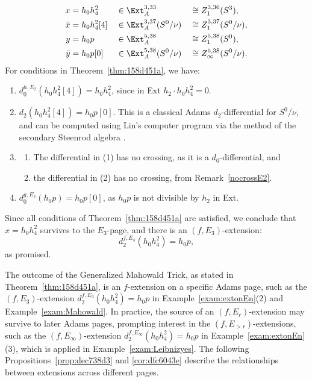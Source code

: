 \documentclass{amsart}
\numberwithin{equation}{section}
\begin{document}
\begin{example}
\begin{align*}
x & =h_0h_4^2 && \in \Ext_A^{3,33} && \cong Z_1^{3,36}(S^3),\\
\bar{x} & =h_0h_4^2[4] && \in \Ext_A^{3,37}(S^0/\nu) && \cong Z_1^{3,37}(S^0/\nu), \\
y & =h_0p && \in \Ext_A^{5,38} && \cong Z_1^{5,38}(S^0),\\
        \bar{y} & =h_0p[0] && \in \Ext_A^{5,38}(S^0/\nu) && \cong Z_\infty^{5,38}(S^0/\nu). 
  \end{align*}      
For conditions in Theorem~\ref{thm:158d451a}, we have:
\begin{enumerate}
      \item $d_0^{h, E_2}(h_0h_4^2[4]) = h_0h_4^2$, since in Ext $h_2 \cdot h_0h_4^2 = 0$.
      \item $d_2(h_0h_4^2[4]) = h_0p[0]$. This is a classical Adams $d_2$-differential for $S^0/\nu$, and can be computed using Lin's computer program via the method of the secondary Steenrod algebra \cite{BJ, Nassau, Chua}.
      \item 
      \begin{enumerate}
          \item The differential in (1) has no crossing, as it is a $d_0$-differential, and
          \item the differential in (2) has no crossing, from Remark~\ref{nocrossE2}. 
      \end{enumerate}
      \item 
      $d_0^{g, E_2} (h_0p) = h_0p[0]$, as $h_0p$ is not divisible by $h_2$ in Ext.
      \end{enumerate}
    Since all conditions of  Theorem~\ref{thm:158d451a} are  satisfied, we conclude that $x=h_0h_4^2$ survives to the $E_3$-page, and there is an $(f, E_3)$-extension:
        $$d_2^{f, E_3} (h_0h_4^2) = h_0 p,$$
        as promised.
        
\end{example}

The outcome of the Generalized Mahowald Trick, as stated in Theorem~\ref{thm:158d451a}, is an $f$-extension on a specific Adams page, such as the $(f, E_3)$-extension $d_2^{f, E_3} (h_0h_4^2) = h_0 p$ in Example~\ref{exam:extonEn}(2) and Example~\ref{exam:Mahowald}. In practice, the source of an $(f, E_r)$-extension may survive to later Adams pages, prompting interest in the $(f, E_{>r})$-extensions, such as the $(f, E_\infty)$-extension $d_2^{f, E_\infty} (h_0h_4^2) = h_0 p$ in Example~\ref{exam:extonEn}(3), which is applied in Example~\ref{exam:Leibnizyes}. The following Propositions~\ref{prop:dec738d3} and \ref{cor:dfc6043e} describe the relationships between extensions across different pages.
\end{document}
